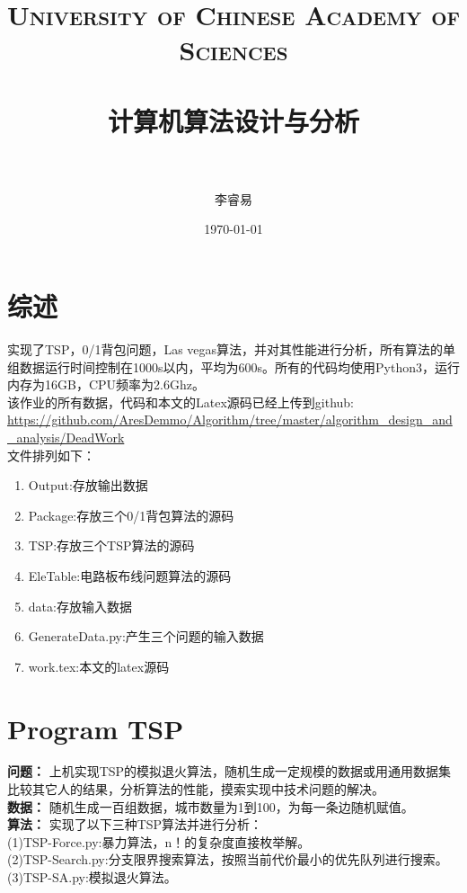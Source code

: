 \documentclass[paper=a4,margin=0.5cm]{scrartcl} %
\title{	
\normalfont \normalsize 
\textsc{University of Chinese Academy of Sciences} \\ [25pt] %
\horrule{0.5pt} \\[0.4cm] %
\huge 计算机算法设计与分析 \\ %
\horrule{2pt} \\[0.5cm] %
}
\author{李睿易} %
\date{\normalsize\today} %
\begin{document}
\maketitle %
\tableofcontents

\section{综述}
\indent 实现了TSP，0/1背包问题，Las vegas算法，并对其性能进行分析，所有算法的单组数据运行时间控制在1000s以内，平均为600s。所有的代码均使用Python3，运行内存为16GB，CPU频率为2.6Ghz。\\
\indent 该作业的所有数据，代码和本文的Latex源码已经上传到github: \\
\indent \url{https://github.com/AresDemmo/Algorithm/tree/master/algorithm_design_and_analysis/DeadWork} \\
\indent 文件排列如下：\\
\begin{enumerate}
		\item Output:存放输出数据
		\item Package:存放三个0/1背包算法的源码
		\item TSP:存放三个TSP算法的源码
		\item EleTable:电路板布线问题算法的源码
		\item data:存放输入数据
		\item GenerateData.py:产生三个问题的输入数据
		\item work.tex:本文的latex源码
\end{enumerate}



\section{Program TSP}

\indent \textbf{问题：} 上机实现TSP的模拟退火算法，随机生成一定规模的数据或用通用数据集比较其它人的结果，分析算法的性能，摸索实现中技术问题的解决。\\
\indent \textbf{数据：} 随机生成一百组数据，城市数量为1到100，为每一条边随机赋值。\\
\indent \textbf{算法：} 实现了以下三种TSP算法并进行分析：\\
\indent (1)TSP-Force.py:暴力算法，n！的复杂度直接枚举解。\\
\indent (2)TSP-Search.py:分支限界搜索算法，按照当前代价最小的优先队列进行搜索。\\
\indent (3)TSP-SA.py:模拟退火算法。\\
\end{document}
